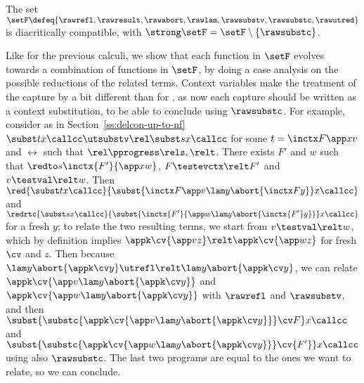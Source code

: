 \documentclass{lmcs}
\theoremstyle{defC}
\begin{document}
\begin{thm}%
  \label{t:compatible-calcc}
  The set $\setF \defeq \{ \rawrefl, \rawresult,
  \rawabort, \rawlam, \rawsubstv, \rawsubstc, \rawutred \}$ is
  diacritically compatible, with $\strong \setF = \setF \setminus \{ \rawsubstc \}$.
\end{thm}
Like for the previous calculi, we show that each function in $\setF$
evolves towards a combination of functions in $\setF$, by doing a case
analysis on the possible reductions of the related terms. Context
variables make the treatment of the capture by \textcallcc a bit
different than for \textshift, as now each capture should be written
as a context substitution, to be able to conclude using
$\rawsubstc$. For example, consider as in
Section~\ref{ss:delcon-up-to-nf} $\subst t x \callcc \utsubstv\rel
\subst s x \callcc$ for some $t = \inctx F {\app x v}$ and $\rel$ such
that $\rel \pprogress \rels, \relt$. There exists $F'$ and $w$ such
that $\redto s {\inctx {F'}{\app x w}}$, $F \testevctx\relt F'$ and $v
\testval\relt w$. Then $\red {\subst t x \callcc}{\subst {\inctx F
    {\app v {\lam y {\abort {\inctx F y}}}}} x \callcc}$ and $\redrtc
              {\subst s x \callcc}{\subst {\inctx {F'}{\app w {\lam y
                      {\abort {\inctx {F'} y}}}}} x \callcc}$ for a
              fresh $y$; to relate the two resulting terms, we start
              from $v \testval\relt w$, which by definition implies
              $\appk \cv {\app v z} \relt \appk \cv {\app w z}$ for
              fresh $\cv$ and $z$. Then because $\lam y {\abort {\appk
                  \cv y}} \utrefl \relt \lam y {\abort {\appk \cv
                  y}}$, we can relate $\appk \cv {\app v \lam y
                {\abort {\appk \cv y}}}$ and $\appk \cv {\app w \lam y
                {\abort {\appk \cv y}}}$ with $\rawrefl$ and
              $\rawsubstv$, and then $\subst{\substc {\appk \cv {\app
                    v \lam y {\abort {\appk \cv y}}}} \cv F} x
              \callcc$ and $\subst{\substc {\appk \cv {\app w \lam y
                    {\abort {\appk \cv y}}}} \cv {F'}} x \callcc$
              using also $\rawsubstc$. The last two programs are equal
              to the ones we want to relate, so we can conclude.
\end{document}
